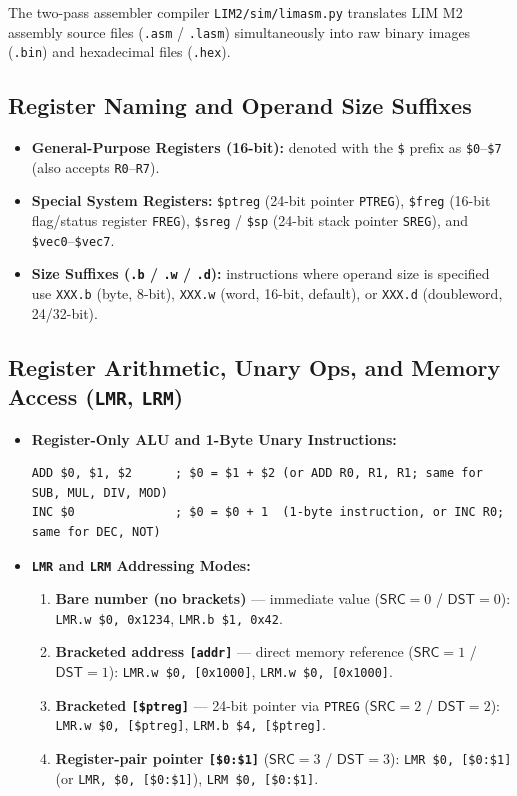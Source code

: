\documentclass[11pt,a4paper]{article}
\newcommand{\reg}[1]{\texttt{#1}}
\newcommand{\field}[1]{\textsf{#1}}
\begin{document}
The two-pass assembler compiler \texttt{LIM2/sim/limasm.py} translates LIM M2 assembly source files (\texttt{.asm} / \texttt{.lasm}) simultaneously into raw binary images (\texttt{.bin}) and hexadecimal files (\texttt{.hex}).

\subsection{Register Naming and Operand Size Suffixes}
\begin{itemize}
  \item \textbf{General-Purpose Registers (16-bit):} denoted with the \texttt{\$} prefix as \texttt{\$0}--\texttt{\$7} (also accepts \texttt{R0}--\texttt{R7}).
  \item \textbf{Special System Registers:} \texttt{\$ptreg} (24-bit pointer \reg{PTREG}), \texttt{\$freg} (16-bit flag/status register \reg{FREG}), \texttt{\$sreg} / \texttt{\$sp} (24-bit stack pointer \reg{SREG}), and \texttt{\$vec0}--\texttt{\$vec7}.
  \item \textbf{Size Suffixes (\texttt{.b} / \texttt{.w} / \texttt{.d}):} instructions where operand size is specified use \texttt{XXX.b} (byte, 8-bit), \texttt{XXX.w} (word, 16-bit, default), or \texttt{XXX.d} (doubleword, 24/32-bit).
\end{itemize}

\subsection{Register Arithmetic, Unary Ops, and Memory Access (\texttt{LMR}, \texttt{LRM})}
\begin{itemize}
  \item \textbf{Register-Only ALU and 1-Byte Unary Instructions:}
\begin{verbatim}
ADD $0, $1, $2      ; $0 = $1 + $2 (or ADD R0, R1, R1; same for SUB, MUL, DIV, MOD)
INC $0              ; $0 = $0 + 1  (1-byte instruction, or INC R0; same for DEC, NOT)
\end{verbatim}
  \item \textbf{\texttt{LMR} and \texttt{LRM} Addressing Modes:}
    \begin{enumerate}
      \item \textbf{Bare number (no brackets)} --- immediate value ($\field{SRC}=0$ / $\field{DST}=0$): \texttt{LMR.w \$0, 0x1234}, \texttt{LMR.b \$1, 0x42}.
      \item \textbf{Bracketed address \texttt{[addr]}} --- direct memory reference ($\field{SRC}=1$ / $\field{DST}=1$): \texttt{LMR.w \$0, [0x1000]}, \texttt{LRM.w \$0, [0x1000]}.
      \item \textbf{Bracketed \texttt{[\$ptreg]}} --- 24-bit pointer via \reg{PTREG} ($\field{SRC}=2$ / $\field{DST}=2$): \texttt{LMR.w \$0, [\$ptreg]}, \texttt{LRM.b \$4, [\$ptreg]}.
      \item \textbf{Register-pair pointer \texttt{[\$0:\$1]}} ($\field{SRC}=3$ / $\field{DST}=3$): \texttt{LMR \$0, [\$0:\$1]} (or \texttt{LMR, \$0, [\$0:\$1]}), \texttt{LRM \$0, [\$0:\$1]}.
    \end{enumerate}
\end{itemize}
\end{document}
